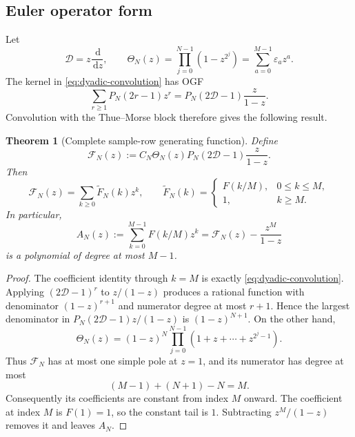 \documentclass[11pt,oneside]{article}
\numberwithin{equation}{section}
\newtheorem{theorem}{Theorem}[section]
\theoremstyle{definition}
\theoremstyle{remark}
\newcommand{\dd}{\,\mathrm d}
\newcommand{\Dop}{\mathcal D}
\newcommand{\Frow}{\mathscr F}
\newcommand{\ThetaTM}{\Theta}
\begin{document}
\subsection{Euler operator form}

Let
\begin{equation}
 \Dop=z\frac{\dd}{\dd z},
 \qquad
 \ThetaTM_N(z)=\prod_{j=0}^{N-1}(1-z^{2^j})
 =\sum_{a=0}^{M-1}\varepsilon_a z^a.
 \label{eq:thetaN}
\end{equation}
The kernel in \eqref{eq:dyadic-convolution} has OGF
\begin{equation}
 \sum_{r\ge1}P_N(2r-1)z^r
 =P_N(2\Dop-1)\frac{z}{1-z}.
 \label{eq:kernel-operator}
\end{equation}
Convolution with the Thue--Morse block therefore gives the following result.

\begin{theorem}[Complete sample-row generating function]
\label{thm:row-ogf}
Define
\begin{equation}
 \Frow_N(z)
 :=C_N\ThetaTM_N(z)P_N(2\Dop-1)\frac{z}{1-z}.
 \label{eq:Frow}
\end{equation}
Then
\begin{equation}
 \Frow_N(z)=\sum_{k\ge0}\widetilde F_N(k)z^k,
 \qquad
 \widetilde F_N(k)=
 \begin{cases}
 F(k/M),&0\le k\le M,\\
 1,&k\ge M.
 \end{cases}
 \label{eq:Frow-coeff}
\end{equation}
In particular,
\begin{equation}
 \boxed{\displaystyle
 A_N(z):=\sum_{k=0}^{M-1}F(k/M)z^k
 =\Frow_N(z)-\frac{z^M}{1-z}}
 \label{eq:AN}
\end{equation}
is a polynomial of degree at most \(M-1\).
\end{theorem}

\begin{proof}
The coefficient identity through \(k=M\) is exactly
\eqref{eq:dyadic-convolution}.  Applying \((2\Dop-1)^r\) to \(z/(1-z)\) produces a
rational function with denominator \((1-z)^{r+1}\) and numerator degree at most
\(r+1\).  Hence the largest denominator in
\(P_N(2\Dop-1)z/(1-z)\) is \((1-z)^{N+1}\).
On the other hand,
\begin{equation}
 \ThetaTM_N(z)=(1-z)^N
 \prod_{j=0}^{N-1}(1+z+\cdots+z^{2^j-1}).
 \label{eq:theta-factor}
\end{equation}
Thus \(\Frow_N\) has at most one simple pole at \(z=1\), and its numerator has degree
at most
\[
 (M-1)+(N+1)-N=M.
\]
Consequently its coefficients are constant from index \(M\) onward.  The coefficient
at index \(M\) is \(F(1)=1\), so the constant tail is \(1\).  Subtracting
\(z^M/(1-z)\) removes it and leaves \(A_N\).
\end{proof}
\end{document}
